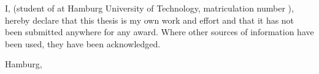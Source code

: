 \makeatletter

\noindent I, {\scshape\tuhhpreamble@author} (student of \tuhhthesis@course{} at Hamburg University of Technology, matriculation number \tuhhthesis@matrnumber), hereby declare that this thesis is my own work and effort and that it has not been submitted anywhere for any award. Where other sources of information have been used, they have been acknowledged.\\

\vspace{2.0cm}

\noindent Hamburg, \printdate

\vspace{1.0cm}
\hfill \tuhhpreamble@author \hspace{2.0cm}

\makeatother


